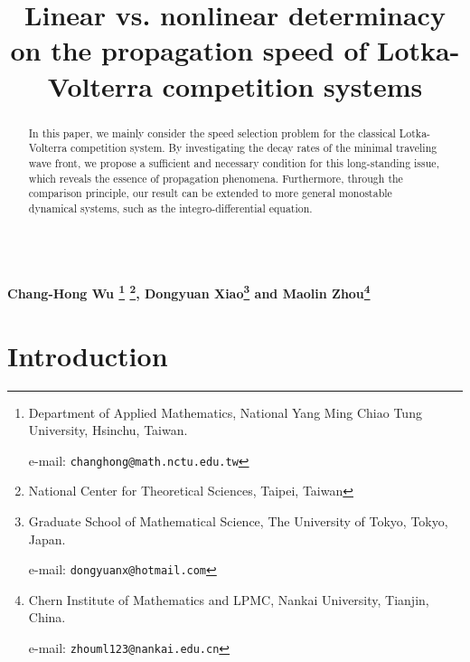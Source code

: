 \documentclass[11pt,a4paper]{article}
\title{Linear vs. nonlinear determinacy on the propagation speed
 of Lotka-Volterra competition systems}
\date{}
\author{}
\numberwithin{equation}{section}
\numberwithin{figure}{section}
\begin{document}
\maketitle
\vspace{-30pt}
\begin{center}
{\large\bf
Chang-Hong Wu
\footnote{Department of Applied Mathematics, National Yang Ming Chiao Tung University, Hsinchu, Taiwan.

e-mail: {\tt changhong@math.nctu.edu.tw}}
\footnote{National Center for Theoretical Sciences, Taipei, Taiwan},
Dongyuan Xiao\footnote{Graduate School of Mathematical Science, The University of Tokyo, Tokyo, Japan.

e-mail: {\tt dongyuanx@hotmail.com}} and
Maolin Zhou\footnote{Chern Institute of Mathematics and LPMC, Nankai University, Tianjin, China.

e-mail: {\tt zhouml123@nankai.edu.cn}}
} \\
[2ex]
\end{center}


\begin{abstract}
In this paper, we mainly consider the speed selection problem for the classical Lotka-Volterra competition system. By investigating the decay rates of the minimal traveling wave front, we propose a sufficient and necessary condition for this long-standing issue, which reveals the essence of propagation phenomena. Furthermore, through the comparison principle, our result can be extended to more general monostable dynamical systems, such as the integro-differential equation.
\\

\\

\end{abstract}

\newpage
\tableofcontents

\newpage
\section{Introduction}
\end{document}

